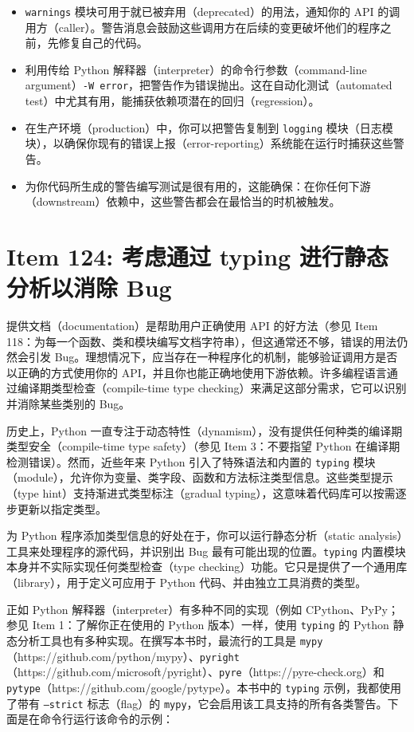 \begin{itemize}
\item \texttt{warnings} 模块可用于就已被弃用（deprecated）的用法，通知你的 API 的调用方（caller）。警告消息会鼓励这些调用方在后续的变更破坏他们的程序之前，先修复自己的代码。
\item 利用传给 Python 解释器（interpreter）的命令行参数（command-line argument）\texttt{-W error}，把警告作为错误抛出。这在自动化测试（automated test）中尤其有用，能捕获依赖项潜在的回归（regression）。
\item 在生产环境（production）中，你可以把警告复制到 \texttt{logging} 模块（日志模块），以确保你现有的错误上报（error-reporting）系统能在运行时捕获这些警告。
\item 为你代码所生成的警告编写测试是很有用的，这能确保：在你任何下游（downstream）依赖中，这些警告都会在最恰当的时机被触发。
\end{itemize}

\section{Item 124: 考虑通过 typing 进行静态分析以消除 Bug}

提供文档（documentation）是帮助用户正确使用 API 的好方法（参见 Item 118：为每一个函数、类和模块编写文档字符串），但这通常还不够，错误的用法仍然会引发 Bug。理想情况下，应当存在一种程序化的机制，能够验证调用方是否以正确的方式使用你的 API，并且你也能正确地使用下游依赖。许多编程语言通过编译期类型检查（compile-time type checking）来满足这部分需求，它可以识别并消除某些类别的 Bug。

历史上，Python 一直专注于动态特性（dynamism），没有提供任何种类的编译期类型安全（compile-time type safety）（参见 Item 3：不要指望 Python 在编译期检测错误）。然而，近些年来 Python 引入了特殊语法和内置的 \texttt{typing} 模块（module），允许你为变量、类字段、函数和方法标注类型信息。这些类型提示（type hint）支持渐进式类型标注（gradual typing），这意味着代码库可以按需逐步更新以指定类型。

为 Python 程序添加类型信息的好处在于，你可以运行静态分析（static analysis）工具来处理程序的源代码，并识别出 Bug 最有可能出现的位置。\texttt{typing} 内置模块本身并不实际实现任何类型检查（type checking）功能。它只是提供了一个通用库（library），用于定义可应用于 Python 代码、并由独立工具消费的类型。

正如 Python 解释器（interpreter）有多种不同的实现（例如 CPython、PyPy；参见 Item 1：了解你正在使用的 Python 版本）一样，使用 \texttt{typing} 的 Python 静态分析工具也有多种实现。在撰写本书时，最流行的工具是 \texttt{mypy}（https://github.com/python/mypy）、\texttt{pyright}（https://github.com/microsoft/pyright）、\texttt{pyre}（https://pyre-check.org）和 \texttt{pytype}（https://github.com/google/pytype）。本书中的 \texttt{typing} 示例，我都使用了带有 \texttt{--strict} 标志（flag）的 \texttt{mypy}，它会启用该工具支持的所有各类警告。下面是在命令行运行该命令的示例：


